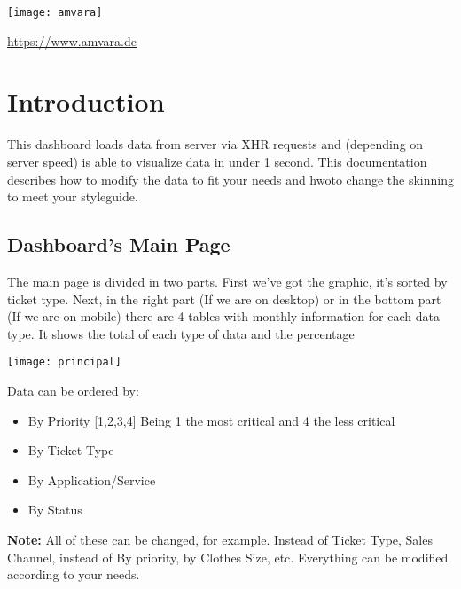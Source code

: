 \documentclass[12pt]{article}
\begin{document}
\maketitle %

\begin{centering} %
	\texttt{[image: amvara]} \par
	\url{https://www.amvara.de} \par
\end{centering}

\newpage %
\tableofcontents %
\newpage


\section{Introduction} %
This dashboard loads data from server via XHR requests and (depending on server speed) is able to visualize data in under 1 second. This documentation describes how to modify the data to fit your needs and hwoto change the skinning to meet your styleguide.

\subsection{Dashboard's Main Page}
\noindent
The main page is divided in two parts. First we've got the graphic, it's sorted by ticket type. Next, in the right part (If we are on desktop) or in the bottom part (If we are on mobile) there are 4 tables with monthly information for each data type. It shows the total of each type of data and the percentage\par
\begin{center}
\texttt{[image: principal]}
\end{center}

Data can be ordered by:
\begin{itemize} %
	\item By Priority [1,2,3,4] Being 1 the most critical and 4 the less critical
	\item By Ticket Type
	\item By Application/Service
	\item By Status
\end{itemize}
\textbf{Note:} All of these can be changed, for example. Instead of Ticket Type, Sales Channel, instead of By priority, by Clothes Size, etc. Everything can be modified according to your needs.\par
\newpage %
\end{document}
